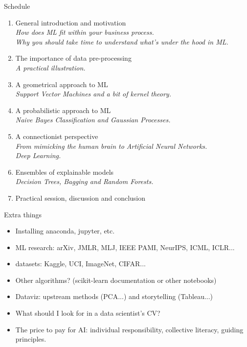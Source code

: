 \documentclass{beamer}
\begin{document}
\begin{frame}{Schedule}
\begin{enumerate}
\item General introduction and motivation \Checkmark \\
{\small \it How does ML fit within your business process.\\
Why you should take time to understand what's under the hood in ML.}
\item The importance of data pre-processing \Checkmark \\
{\small \it A practical illustration.}
\item A geometrical approach to ML \Checkmark \\
{\small \it Support Vector Machines and a bit of kernel theory.}
\item A probabilistic approach to ML \Checkmark \\
{\small \it Naive Bayes Classification and Gaussian Processes.}
\item A connectionist perspective \Checkmark \\
{\small \it From mimicking the human brain to Artificial Neural Networks.\\
Deep Learning.}
\item Ensembles of explainable models \Checkmark \\
{\small \it Decision Trees, Bagging and Random Forests.}
\item Practical session, discussion and conclusion
\end{enumerate}
\end{frame}

\begin{frame}{Extra things}
\begin{itemize}
\item Installing anaconda, jupyter, etc.
\item ML research: arXiv, JMLR, MLJ, IEEE PAMI, NeurIPS, ICML, ICLR...
\item datasets: Kaggle, UCI, ImageNet, CIFAR...
\item Other algorithms? (scikit-learn documentation or other notebooks)
\item Dataviz: upstream methods (PCA...) and storytelling (Tableau...)
\item What should I look for in a data scientist's CV?
\item The price to pay for AI: individual responsibility, collective literacy, guiding principles.
\end{itemize}
\end{frame}
\end{document}

